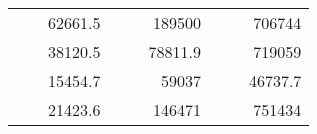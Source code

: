 \begin{table}[]
\begin{tabular}{|ccrccrccc}
\rowcolor[HTML]{DDFDFF} 
\multicolumn{1}{|c|}{\cellcolor[HTML]{FFFFC7}}                                & \multicolumn{1}{c|}{\cellcolor[HTML]{DDFDFF}}                      & \multicolumn{1}{r|}{\cellcolor[HTML]{DAE8FC}62661.5}   & \multicolumn{1}{c|}{\cellcolor[HTML]{FFFFC7}}                                & \multicolumn{1}{c|}{\cellcolor[HTML]{DDFDFF}}                       & \multicolumn{1}{r|}{\cellcolor[HTML]{DDFDFF}189500}    & \multicolumn{1}{c|}{\cellcolor[HTML]{FFFFC7}}                                & \multicolumn{1}{c|}{\cellcolor[HTML]{DDFDFF}}                      & \multicolumn{1}{r|}{\cellcolor[HTML]{DDFDFF}706744}    \\ \cline{3-3} \cline{6-6} \cline{9-9} 
\multicolumn{1}{|c|}{\cellcolor[HTML]{FFFFC7}}                                & \multicolumn{1}{c|}{\cellcolor[HTML]{DDFDFF}}                      & \multicolumn{1}{r|}{\cellcolor[HTML]{DDFDFF}38120.5}   & \multicolumn{1}{c|}{\cellcolor[HTML]{FFFFC7}}                                & \multicolumn{1}{c|}{\cellcolor[HTML]{DDFDFF}}                       & \multicolumn{1}{r|}{\cellcolor[HTML]{DAE8FC}78811.9}   & \multicolumn{1}{c|}{\cellcolor[HTML]{FFFFC7}}                                & \multicolumn{1}{c|}{\cellcolor[HTML]{DDFDFF}}                      & \multicolumn{1}{r|}{\cellcolor[HTML]{DAE8FC}719059}    \\ \cline{3-3} \cline{6-6} \cline{9-9} 
\rowcolor[HTML]{DDFDFF} 
\multicolumn{1}{|c|}{\cellcolor[HTML]{FFFFC7}}                                & \multicolumn{1}{c|}{\cellcolor[HTML]{DDFDFF}}                      & \multicolumn{1}{r|}{\cellcolor[HTML]{DAE8FC}15454.7}   & \multicolumn{1}{c|}{\cellcolor[HTML]{FFFFC7}}                                & \multicolumn{1}{c|}{\cellcolor[HTML]{DDFDFF}}                       & \multicolumn{1}{r|}{\cellcolor[HTML]{DDFDFF}59037}     & \multicolumn{1}{c|}{\cellcolor[HTML]{FFFFC7}}                                & \multicolumn{1}{c|}{\cellcolor[HTML]{DDFDFF}}                      & \multicolumn{1}{r|}{\cellcolor[HTML]{DDFDFF}46737.7}   \\ \cline{3-3} \cline{6-6} \cline{9-9} 
\multicolumn{1}{|c|}{\cellcolor[HTML]{FFFFC7}}                                & \multicolumn{1}{c|}{\cellcolor[HTML]{DDFDFF}}                      & \multicolumn{1}{r|}{\cellcolor[HTML]{DDFDFF}21423.6}   & \multicolumn{1}{c|}{\cellcolor[HTML]{FFFFC7}}                                & \multicolumn{1}{c|}{\cellcolor[HTML]{DDFDFF}}                       & \multicolumn{1}{r|}{\cellcolor[HTML]{DAE8FC}146471}    & \multicolumn{1}{c|}{\cellcolor[HTML]{FFFFC7}}                                & \multicolumn{1}{c|}{\cellcolor[HTML]{DDFDFF}}                      & \multicolumn{1}{r|}{\cellcolor[HTML]{DAE8FC}751434}    \\ \cline{3-3} \cline{6-6} \cline{9-9} 

\end{tabular}
\end{table}
